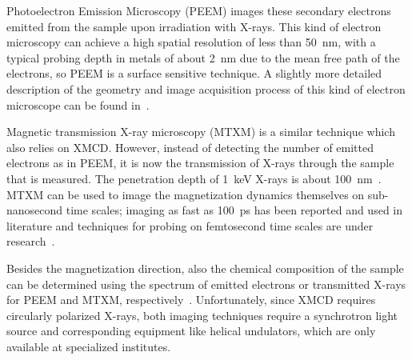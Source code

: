 \documentclass[11pt,a4paper,english]{article}
\begin{document}
Photoelectron Emission Microscopy (PEEM) images these secondary electrons emitted from the sample upon irradiation with X-rays. This kind of electron microscopy can achieve a high spatial resolution of less than \SI{50}{\nano\metre}, with a typical probing depth in metals of about \SI{2}{\nano\metre} due to the mean free path of the electrons, so PEEM is a surface sensitive technique. A slightly more detailed description of the geometry and image acquisition process of this kind of electron microscope can be found in~\cite{PEEM}. \par 

Magnetic transmission X-ray microscopy (MTXM) is a similar technique which also relies on XMCD. However, instead of detecting the number of emitted electrons as in PEEM, it is now the transmission of X-rays through the sample that is measured. The penetration depth of \SI{1}{\kilo\electronvolt} X-rays is about \SI{100}{\nano\metre}~\cite{Imaging_MTXM}. MTXM can be used to image the magnetization dynamics themselves on sub-nanosecond time scales; imaging as fast as \SI{100}{\pico\second} has been reported and used in literature and techniques for probing on femtosecond time scales are under research~\cite{SubnanosecondPropagation_AnisotropyChains, Imaging_MTXM}. \par

Besides the magnetization direction, also the chemical composition of the sample can be determined using the spectrum of emitted electrons or transmitted X-rays for PEEM and MTXM, respectively~\cite{PEEM,Imaging_MTXM}. Unfortunately, since XMCD requires circularly polarized X-rays, both imaging techniques require a synchrotron light source and corresponding equipment like helical undulators, which are only available at specialized institutes.
\end{document}
